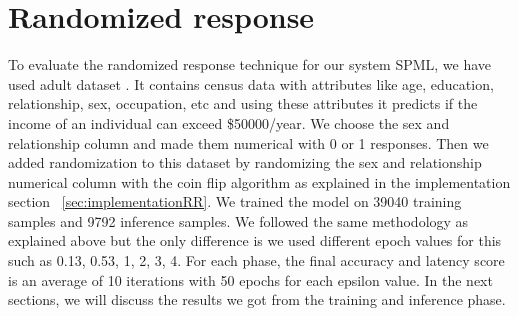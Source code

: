 \section{Randomized response}
To evaluate the randomized response technique for our system SPML, we have used adult dataset \cite{15}. It contains census data with attributes like age, education, relationship, sex, occupation, etc and using these attributes it predicts if the income of an individual can exceed \$50000/year. We choose the sex and relationship column and made them numerical with 0 or 1 responses. Then we added randomization to this dataset by randomizing the sex and relationship numerical column with the coin flip algorithm as explained in the implementation section ~\ref{sec:implementationRR}. We trained the model on 39040 training samples and 9792 inference samples. We followed the same methodology as explained above but the only difference is we used different epoch values for this such as 0.13, 0.53, 1, 2, 3, 4. For each phase, the final accuracy and latency score is an average of 10 iterations with 50 epochs for each epsilon value. In the next sections, we will discuss the results we got from the training and inference phase.

